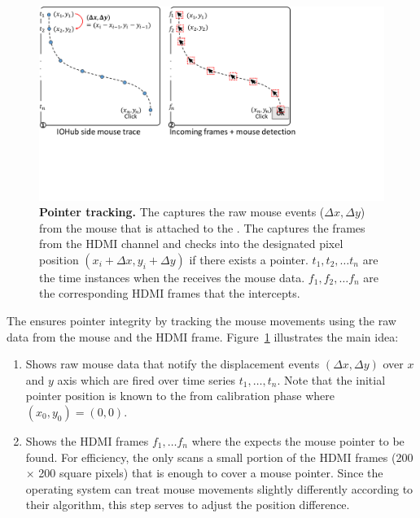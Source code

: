 \begin{figure}[t]
\centering
\includegraphics[trim={0 5.2cm 8cm 0}, clip, width=0.9\linewidth]{chapters/ProtectIOn/images/mouseAnalysis.pdf}
\caption[\name Pointer tracking]{\textbf{Pointer tracking.} \one The \device captures the raw mouse events ($\Delta x, \Delta y$) from the mouse that is attached to the \device. \two The \device captures the frames from the HDMI channel and checks into the designated pixel position $(x_i + \Delta x, y_i + \Delta y)$ if there exists a pointer. $t_1, t_2,\ldots t_n$ are the time instances when the \device receives the mouse data. $f_1, f_2,\ldots f_n$ are the corresponding HDMI frames that the \device intercepts.}
\spacesave
\label{fig:mouseAnalysis}
\centering
\end{figure}


 The \device ensures pointer integrity by tracking the mouse movements using the raw data from the mouse and the HDMI frame.  Figure~\ref{fig:mouseAnalysis} illustrates the main idea: 

\begin{enumerate}
\item[]\one Shows raw mouse data that notify the displacement events $(\Delta x, \Delta y)$ over $x$ and $y$ axis which are fired over time series $t_1,\ldots, t_n$. Note that the initial pointer position is known to the \device from calibration phase where $(x_0, y_0) = (0, 0)$.  
\item[]\two Shows the HDMI frames $f_1,\ldots f_n$ where the \device expects the mouse pointer to be found. For efficiency, the \device only scans a small portion of the HDMI frames (200 $\times$ 200 square pixels) that is enough to cover a mouse pointer. Since the operating system can treat mouse movements slightly differently according to their algorithm, this step serves to adjust the position difference.
\end{enumerate}


